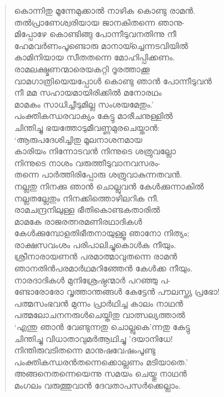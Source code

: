 \begin{verse}
കൊന്നിതു മൂന്നേമുക്കാല്‍ നാഴിക കൊണ്ടു രാമന്‍.\\
തല്‍പ്രാണേശ്വരിയായ ജാനകിതന്നെ ഞാനു-\\
മിപ്പോഴേ കൊണ്ടിങ്ങു പോന്നീടുവനതിന്നു നീ\\
ഹേമവര്‍ണംപൂണ്ടൊരു മാനായ്ച്ചെന്നടവിയില്‍\\
കാമിനിയായ സീതതന്നെ മോഹിപ്പിക്കണം.\\
രാമലക്ഷ്മണന്മാരെയകറ്റി ദൂരത്താക്കൂ\\
വാമഗാത്രിയെയപ്പോള്‍ കൊണ്ടു ഞാന്‍ പോന്നീടുവന്‍\\
നീ മമ സഹായമായിരിക്കില്‍ മനോരഥം\\
മാമകം സാധിച്ചീടുമില്ല സംശയമേതും.’\\
പംക്തികന്ധരവാക്യം കേട്ടു മാരീചനുള്ളില്‍\\
ചിന്തിച്ചു ഭയത്തോടുമീവണ്ണമുരചെയ്താന്‍:\\
‘ആരുപദേശിച്ചിതു മൂലനാശനമായ\\
കാരിയം നിന്നോടവന്‍ നിന്നുടെ ശത്രുവല്ലോ\\
നിന്നുടെ നാശം വരുത്തീടുവാനവസരം-\\
തന്നെ പാര്‍ത്തിരിപ്പോരു ശത്രുവാകുന്നതവന്‍.\\
നല്ലതു നിനക്കു ഞാന്‍ ചൊല്ലുവന്‍ കേള്‍ക്കുന്നാകില്‍\\
നല്ലതല്ലേതും നിനക്കിത്തൊഴിലറിക നീ.\\
രാമചന്ദ്രനിലുള്ള ഭീതികൊണ്ടകതാരില്‍\\
മാമകേ രാജരത്നരമണിരഥാദികള്‍\\
കേള്‍ക്കുമ്പോളതിഭീതനായുള്ളൂ ഞാനോ നിത്യം;\\
രാക്ഷസവംശം പരിപാലിച്ചുകൊള്‍ക നീയും.\\
ശ്രീനാരായണന്‍ പരമാത്മാവുതന്നെ രാമന്‍\\
ഞാനതിന്‍പരമാര്‍ഥമറിഞ്ഞേന്‍ കേള്‍ക്ക നീയും.\\
നാരദാദികള്‍ മുനിശ്രേഷ്ഠന്മാര്‍ പറഞ്ഞു പ-\\
ണ്ടോരോരോ വൃത്താന്തങ്ങള്‍ കേട്ടേന്‍ പൗലസ്ത്യ പ്രഭോ!\\
പത്മസംഭവന്‍ മുന്നം പ്രാര്‍ഥിച്ച കാലം നാഥന്‍\\
പത്മലോചനനരുള്‍ചെയ്തിതു വാത്സല്യത്താല്‍\\
‘എന്തു ഞാന്‍ വേണ്ടുന്നതു ചൊല്ലുകെ’ന്നതു കേട്ടു\\
ചിന്തിച്ചു വിധാതാവുമര്‍ആഥിച്ചു ’ദയാനിധേ!\\
നിന്തിരുവടിതന്നെ മാനുഷവേഷംപൂണ്ടു\\
പംക്തികന്ധരന്‍തന്നെക്കൊല്ലണം മടിയാതെ.’\\
അങ്ങനെതന്നെയെന്നു സമയം ചെയ്തു നാഥന്‍\\
മംഗലം വരുത്തുവാന്‍ ദേവതാപസര്‍ക്കെല്ലാം.\\

\end{verse}
